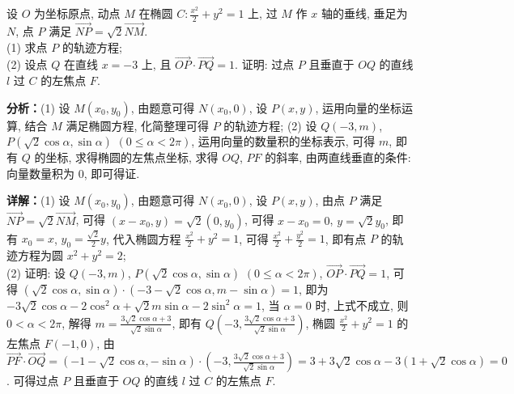 \begin{question}[points=12]
设 $O$ 为坐标原点, 动点 $M$ 在椭圆 $C: \frac{x^2}{2}+y^2=1$ 上, 过 $M$ 作 $x$ 轴的垂线, 垂足为 $N$, 点 $P$ 满足 $\overrightarrow{NP}=\sqrt{2}\overrightarrow{NM}$. \\ (1) 求点 $P$ 的轨迹方程; \\ (2) 设点 $Q$ 在直线 $x=-3$ 上, 且 $\overrightarrow{OP}\cdot\overrightarrow{PQ}=1$. 证明: 过点 $P$ 且垂直于 $OQ$ 的直线 $l$ 过 $C$ 的左焦点 $F$.
\begin{solution}

\textbf{分析：}(1) 设 $M(x_0,y_0)$, 由题意可得 $N(x_0,0)$, 设 $P(x,y)$, 运用向量的坐标运算, 结合 $M$ 满足椭圆方程, 化简整理可得 $P$ 的轨迹方程; (2) 设 $Q(-3,m)$, $P(\sqrt{2}\cos\alpha,\sin\alpha)$ $(0\le\alpha<2\pi)$, 运用向量的数量积的坐标表示, 可得 $m$, 即有 $Q$ 的坐标, 求得椭圆的左焦点坐标, 求得 $OQ$, $PF$ 的斜率, 由两直线垂直的条件: 向量数量积为 $0$, 即可得证.

\textbf{详解：}(1) 设 $M(x_0,y_0)$, 由题意可得 $N(x_0,0)$, 设 $P(x,y)$, 由点 $P$ 满足 $\overrightarrow{NP}=\sqrt{2}\overrightarrow{NM}$, 可得 $(x-x_0,y)=\sqrt{2}(0,y_0)$, 可得 $x-x_0=0$, $y=\sqrt{2}y_0$, 即有 $x_0=x$, $y_0=\frac{\sqrt{2}}{2}y$, 代入椭圆方程 $\frac{x^2}{2}+y^2=1$, 可得 $\frac{x^2}{2}+\frac{y^2}{2}=1$, 即有点 $P$ 的轨迹方程为圆 $x^2+y^2=2$; \\ (2) 证明: 设 $Q(-3,m)$, $P(\sqrt{2}\cos\alpha,\sin\alpha)$ $(0\le\alpha<2\pi)$, $\overrightarrow{OP}\cdot\overrightarrow{PQ}=1$, 可得 $(\sqrt{2}\cos\alpha,\sin\alpha)\cdot(-3-\sqrt{2}\cos\alpha,m-\sin\alpha)=1$, 即为 $-3\sqrt{2}\cos\alpha-2\cos^2\alpha+\sqrt{2}m\sin\alpha-2\sin^2\alpha=1$, 当 $\alpha=0$ 时, 上式不成立, 则 $0<\alpha<2\pi$, 解得 $m=\frac{3\sqrt{2}\cos\alpha+3}{\sqrt{2}\sin\alpha}$, 即有 $Q\left(-3,\frac{3\sqrt{2}\cos\alpha+3}{\sqrt{2}\sin\alpha}\right)$, 椭圆 $\frac{x^2}{2}+y^2=1$ 的左焦点 $F(-1,0)$, 由 $\overrightarrow{PF}\cdot\overrightarrow{OQ}=(-1-\sqrt{2}\cos\alpha,-\sin\alpha)\cdot\left(-3,\frac{3\sqrt{2}\cos\alpha+3}{\sqrt{2}\sin\alpha}\right)=3+3\sqrt{2}\cos\alpha-3(1+\sqrt{2}\cos\alpha)=0$. 可得过点 $P$ 且垂直于 $OQ$ 的直线 $l$ 过 $C$ 的左焦点 $F$.
\end{solution}
\end{question}

